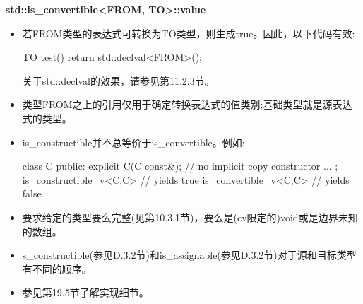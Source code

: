 \textbf{std::is\_convertible<FROM, TO>::value}

\begin{itemize}
\item
若FROM类型的表达式可转换为TO类型，则生成true。因此，以下代码有效:

\begin{cpp}
TO test() {
	return std::declval<FROM>();
}
\end{cpp}

\begin{notice}关于std::declval的效果，请参见第11.2.3节。
\end{notice}

\item
类型FROM之上的引用仅用于确定转换表达式的值类别;基础类型就是源表达式的类型。

\item
is\_constructible并不总等价于is\_convertible。例如:

\begin{cpp}
class C {
	public:
	explicit C(C const&); // no implicit copy constructor
	...
};
is_constructible_v<C,C> // yields true
is_convertible_v<C,C> // yields false
\end{cpp}

\item
要求给定的类型要么完整(见第10.3.1节)，要么是(cv限定的)void或是边界未知的数组。

\item
s\_constructible(参见D.3.2节)和is\_assignable(参见D.3.2节)对于源和目标类型有不同的顺序。

\item
参见第19.5节了解实现细节。
\end{itemize}
